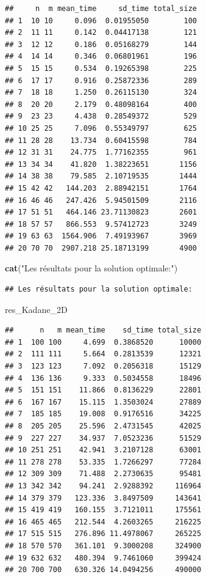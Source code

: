 \documentclass[
]{article}
\newenvironment{Shaded}{\begin{snugshade}}{\end{snugshade}}
\newcommand{\FunctionTok}[1]{\textcolor[rgb]{0.13,0.29,0.53}{\textbf{#1}}}
\newcommand{\NormalTok}[1]{#1}
\newcommand{\StringTok}[1]{\textcolor[rgb]{0.31,0.60,0.02}{#1}}
\begin{document}
\begin{verbatim}
##     n  m mean_time     sd_time total_size
## 1  10 10     0.096  0.01955050        100
## 2  11 11     0.142  0.04417138        121
## 3  12 12     0.186  0.05168279        144
## 4  14 14     0.346  0.06801961        196
## 5  15 15     0.534  0.19265398        225
## 6  17 17     0.916  0.25872336        289
## 7  18 18     1.250  0.26115130        324
## 8  20 20     2.179  0.48098164        400
## 9  23 23     4.438  0.28549372        529
## 10 25 25     7.096  0.55349797        625
## 11 28 28    13.734  0.60415598        784
## 12 31 31    24.775  1.77162355        961
## 13 34 34    41.820  1.38223651       1156
## 14 38 38    79.585  2.10719535       1444
## 15 42 42   144.203  2.88942151       1764
## 16 46 46   247.426  5.94501509       2116
## 17 51 51   464.146 23.71130823       2601
## 18 57 57   866.553  9.57412723       3249
## 19 63 63  1564.906  7.49193967       3969
## 20 70 70  2907.218 25.18713199       4900
\end{verbatim}

\begin{Shaded}
\begin{Highlighting}[]
\FunctionTok{cat}\NormalTok{(}\StringTok{"Les résultats pour la solution optimale:"}\NormalTok{)}
\end{Highlighting}
\end{Shaded}

\begin{verbatim}
## Les résultats pour la solution optimale:
\end{verbatim}

\begin{Shaded}
\begin{Highlighting}[]
\NormalTok{res\_Kadane\_2D}
\end{Highlighting}
\end{Shaded}

\begin{verbatim}
##      n   m mean_time    sd_time total_size
## 1  100 100     4.699  0.3868520      10000
## 2  111 111     5.664  0.2813539      12321
## 3  123 123     7.092  0.2056318      15129
## 4  136 136     9.333  0.5034558      18496
## 5  151 151    11.866  0.8136229      22801
## 6  167 167    15.115  1.3503024      27889
## 7  185 185    19.008  0.9176516      34225
## 8  205 205    25.596  2.4731545      42025
## 9  227 227    34.937  7.0523236      51529
## 10 251 251    42.941  3.2107128      63001
## 11 278 278    53.335  1.7266297      77284
## 12 309 309    71.488  2.2730635      95481
## 13 342 342    94.241  2.9288392     116964
## 14 379 379   123.336  3.8497509     143641
## 15 419 419   160.155  3.7121011     175561
## 16 465 465   212.544  4.2603265     216225
## 17 515 515   276.896 11.4978067     265225
## 18 570 570   361.101  9.3000208     324900
## 19 632 632   480.394  9.7461060     399424
## 20 700 700   630.326 14.0494256     490000
\end{verbatim}
\end{document}
